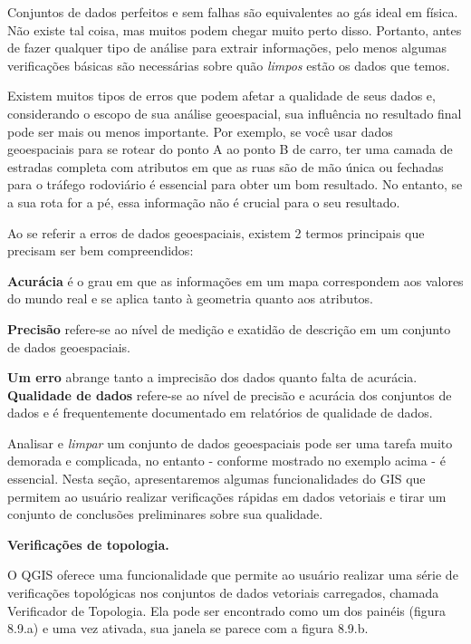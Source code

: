 \documentclass[
  portuguese,
]{krantz}
\begin{document}
Conjuntos de dados perfeitos e sem falhas são equivalentes ao gás ideal em física. Não existe tal coisa, mas muitos podem chegar muito perto disso. Portanto, antes de fazer qualquer tipo de análise para extrair informações, pelo menos algumas verificações básicas são necessárias sobre quão \emph{limpos} estão os dados que temos.

Existem muitos tipos de erros que podem afetar a qualidade de seus dados e, considerando o escopo de sua análise geoespacial, sua influência no resultado final pode ser mais ou menos importante. Por exemplo, se você usar dados geoespaciais para se rotear do ponto A ao ponto B de carro, ter uma camada de estradas completa com atributos em que as ruas são de mão única ou fechadas para o tráfego rodoviário é essencial para obter um bom resultado. No entanto, se a sua rota for a pé, essa informação não é crucial para o seu resultado.

Ao se referir a erros de dados geoespaciais, existem 2 termos principais que precisam ser bem compreendidos:

\textbf{Acurácia} é o grau em que as informações em um mapa correspondem aos valores do mundo real e se aplica tanto à geometria quanto aos atributos.

\textbf{Precisão} refere-se ao nível de medição e exatidão de descrição em um conjunto de dados geoespaciais.

\textbf{Um erro} abrange tanto a imprecisão dos dados quanto falta de acurácia. \textbf{Qualidade de dados} refere-se ao nível de precisão e acurácia dos conjuntos de dados e é frequentemente documentado em relatórios de qualidade de dados.

Analisar e \emph{limpar} um conjunto de dados geoespaciais pode ser uma tarefa muito demorada e complicada, no entanto - conforme mostrado no exemplo acima - é essencial. Nesta seção, apresentaremos algumas funcionalidades do GIS que permitem ao usuário realizar verificações rápidas em dados vetoriais e tirar um conjunto de conclusões preliminares sobre sua qualidade.

\textbf{Verificações de topologia.}

O QGIS oferece uma funcionalidade que permite ao usuário realizar uma série de verificações topológicas nos conjuntos de dados vetoriais carregados, chamada Verificador de Topologia. Ela pode ser encontrado como um dos painéis (figura 8.9.a) e uma vez ativada, sua janela se parece com a figura 8.9.b.
\end{document}
